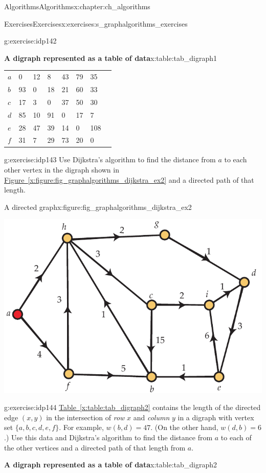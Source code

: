 \documentclass[oneside,10pt,]{book}
\newcommand{\xreffont}{\relax}
\numberwithin{equation}{section}
\begin{document}
\begin{chapterptx}{Algorithms}{}{Algorithms}{}{}{x:chapter:ch_algorithms}
\begin{exercises-section}{Exercises}{}{Exercises}{}{}{x:exercises:s_graphalgorithms_exercises}
\begin{divisionexercise}{12}{}{}{g:exercise:idp142}
\begin{tableptx}{\textbf{A digraph represented as a table of data}}{x:table:tab_digraph1}{}
{\begin{tabular}{lAllllll}
\(a\)&0&12&8&43&79&35\tabularnewline[0pt]
\(b\)&93&0&18&21&60&33\tabularnewline[0pt]
\(c\)&17&3&0&37&50&30\tabularnewline[0pt]
\(d\)&85&10&91&0&17&7\tabularnewline[0pt]
\(e\)&28&47&39&14&0&108\tabularnewline[0pt]
\(f\)&31&7&29&73&20&0
\end{tabular}
}%
\end{tableptx}%
\end{divisionexercise}%
\begin{divisionexercise}{13}{}{}{g:exercise:idp143}%
Use Dijkstra's algorithm to find the distance from \(a\) to each other vertex in the digraph shown in \hyperref[x:figure:fig_graphalgorithms_dijkstra_ex2]{Figure~{\xreffont\ref{x:figure:fig_graphalgorithms_dijkstra_ex2}}} and a directed path of that length.%
\begin{figureptx}{A directed graph}{x:figure:fig_graphalgorithms_dijkstra_ex2}{}%
\begin{image}{0.175}{0.65}{0.175}%
\includegraphics[width=\linewidth]{images/dijkstra_ex2}
\end{image}%
\tcblower
\end{figureptx}%
\end{divisionexercise}%
\begin{divisionexercise}{14}{}{}{g:exercise:idp144}%
\hyperref[x:table:tab_digraph2]{Table~{\xreffont\ref{x:table:tab_digraph2}}} contains the length of the directed edge \((x,y)\) in the intersection of \emph{row} \(x\) and \emph{column} \(y\) in a digraph with vertex set \(\{a,b,c,d,e,f\}\). For example, \(w(b,d)=47\). (On the other hand, \(w(d,b)=6\).) Use this data and Dijkstra's algorithm to find the distance from \(a\) to each of the other vertices and a directed path of that length from \(a\).%
\begin{tableptx}{\textbf{A digraph represented as a table of data}}{x:table:tab_digraph2}{}%

\end{tableptx}
\end{divisionexercise}
\end{exercises-section}
\end{chapterptx}
\end{document}
